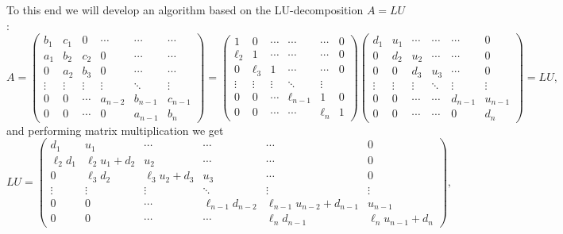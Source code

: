 \documentclass[english,notitlepage]{revtex4-1}  %
\begin{document}
To this end we will develop an algorithm based on the LU-decomposition $A = LU$:
\begin{equation} A= 
	\begin{pmatrix}
	b_1 & c_1 & 0 & \cdots & \cdots & \cdots \\
	a_1 & b_2 & c_2 & 0  &\cdots & \cdots  \\ 
	0 & a_2 & b_3 & 0 & \cdots & \cdots \\
	\vdots & \vdots & \vdots & \vdots & \ddots & \vdots \\
	0 & 0 & \cdots & a_{n-2} & b_{n-1} & c_{n-1} \\
	0 & 0 & \cdots  & 0 & a_{n-1} & b_n
	\end{pmatrix}
	= 
	\begin{pmatrix}
	1 & 0 & \cdots &  \cdots & \cdots & 0 \\
	\ell_2 & 1 & \cdots & \cdots & \cdots & 0 \\
	0 & \ell_3 & 1 & \cdots & \cdots & 0 \\
	\vdots & \vdots & \vdots & \ddots & \vdots \\
	0 & 0 & \cdots & \ell_{n-1} & 1 & 0 \\
	0 & 0 & \cdots &\cdots & \ell_n & 1  
	\end{pmatrix}
	\begin{pmatrix}
	d_1 & u_1 & \cdots & \cdots &\cdots & 0 \\ 
	0 & d_2 & u_2 & \cdots & \cdots & 0 \\
	0 & 0 & d_3 & u_3 & \cdots & 0 \\
	\vdots & \vdots & \vdots & \ddots & \vdots & \vdots \\
	0 & 0 & \cdots & \cdots & d_{n-1} & u_{n-1} \\
	0 & 0 & \cdots & \cdots & 0 & d_n
	\end{pmatrix}
	= LU,
\end{equation}
and performing matrix multiplication we get 
\begin{equation}
	LU = 
	\begin{pmatrix}
	d_1 & u_1 & \cdots & \cdots &\cdots & 0 \\ 
	\ell_2d_1 & \ell_2u_1 + d_2 & u_2 & \cdots & \cdots & 0 \\
	0 & \ell_3d_2 & \ell_3u_2 + d_3 & u_3 & \cdots & 0 \\
	\vdots & \vdots & \vdots & \ddots & \vdots & \vdots \\
	0 & 0 & \cdots & \ell_{n-1}d_{n-2} & \ell_{n-1}u_{n-2} + d_{n-1} & u_{n-1} \\
	0 & 0 & \cdots & \cdots & \ell_nd_{n-1} & \ell_n u_{n-1} + d_n
	\end{pmatrix},
\end{equation}
\end{document}
